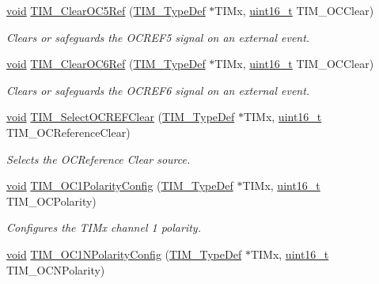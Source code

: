 \begin{DoxyCompactItemize}
\hyperlink{group___n_a_m_e_ga18028b8badbf1ea7e704ccac3c488e82}{void} \hyperlink{group___t_i_m___group2_ga01b5aee2ebf7e69a6b62cff4be6e1c01}{T\-I\-M\-\_\-\-Clear\-O\-C5\-Ref} (\hyperlink{struct_t_i_m___type_def}{T\-I\-M\-\_\-\-Type\-Def} $\ast$T\-I\-Mx, \hyperlink{stdint_8h_a273cf69d639a59973b6019625df33e30}{uint16\-\_\-t} T\-I\-M\-\_\-\-O\-C\-Clear)
\begin{DoxyCompactList}\small\item\em Clears or safeguards the O\-C\-R\-E\-F5 signal on an external event. \end{DoxyCompactList}\item 
\hyperlink{group___n_a_m_e_ga18028b8badbf1ea7e704ccac3c488e82}{void} \hyperlink{group___t_i_m___group2_ga38504678791b49fa5860be57b531fd9a}{T\-I\-M\-\_\-\-Clear\-O\-C6\-Ref} (\hyperlink{struct_t_i_m___type_def}{T\-I\-M\-\_\-\-Type\-Def} $\ast$T\-I\-Mx, \hyperlink{stdint_8h_a273cf69d639a59973b6019625df33e30}{uint16\-\_\-t} T\-I\-M\-\_\-\-O\-C\-Clear)
\begin{DoxyCompactList}\small\item\em Clears or safeguards the O\-C\-R\-E\-F6 signal on an external event. \end{DoxyCompactList}\item 
\hyperlink{group___n_a_m_e_ga18028b8badbf1ea7e704ccac3c488e82}{void} \hyperlink{group___t_i_m___group2_ga36d874564299c141116a4810638dacd2}{T\-I\-M\-\_\-\-Select\-O\-C\-R\-E\-F\-Clear} (\hyperlink{struct_t_i_m___type_def}{T\-I\-M\-\_\-\-Type\-Def} $\ast$T\-I\-Mx, \hyperlink{stdint_8h_a273cf69d639a59973b6019625df33e30}{uint16\-\_\-t} T\-I\-M\-\_\-\-O\-C\-Reference\-Clear)
\begin{DoxyCompactList}\small\item\em Selects the O\-C\-Reference Clear source. \end{DoxyCompactList}\item 
\hyperlink{group___n_a_m_e_ga18028b8badbf1ea7e704ccac3c488e82}{void} \hyperlink{group___t_i_m___group2_ga03878f78163485c8a3508cff2111c297}{T\-I\-M\-\_\-\-O\-C1\-Polarity\-Config} (\hyperlink{struct_t_i_m___type_def}{T\-I\-M\-\_\-\-Type\-Def} $\ast$T\-I\-Mx, \hyperlink{stdint_8h_a273cf69d639a59973b6019625df33e30}{uint16\-\_\-t} T\-I\-M\-\_\-\-O\-C\-Polarity)
\begin{DoxyCompactList}\small\item\em Configures the T\-I\-Mx channel 1 polarity. \end{DoxyCompactList}\item 
\hyperlink{group___n_a_m_e_ga18028b8badbf1ea7e704ccac3c488e82}{void} \hyperlink{group___t_i_m___group2_ga3cb91578e7dd34ea7d09862482960445}{T\-I\-M\-\_\-\-O\-C1\-N\-Polarity\-Config} (\hyperlink{struct_t_i_m___type_def}{T\-I\-M\-\_\-\-Type\-Def} $\ast$T\-I\-Mx, \hyperlink{stdint_8h_a273cf69d639a59973b6019625df33e30}{uint16\-\_\-t} T\-I\-M\-\_\-\-O\-C\-N\-Polarity)

\end{DoxyCompactItemize}
